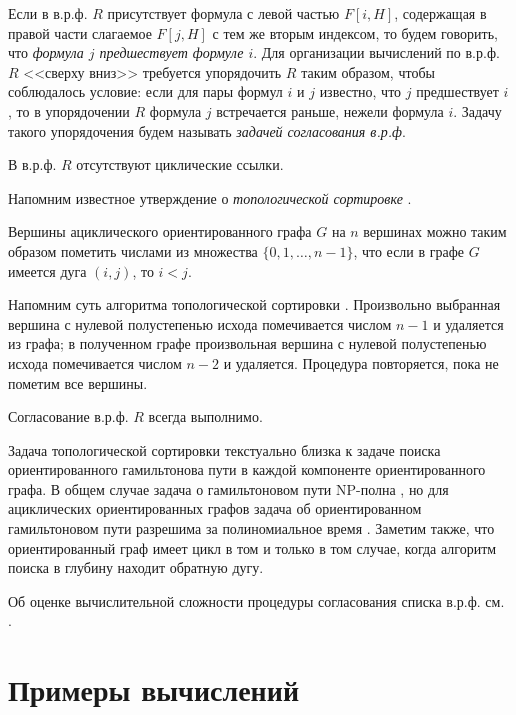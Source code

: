 Если в в.р.ф. $R$ присутствует формула с левой частью $F[i,H]$, содержащая в правой части слагаемое $F[j,H]$ с тем же вторым индексом, то будем говорить, что \textit{ формула $j$ предшествует формуле $i$}. Для организации вычислений по в.р.ф. $R$ <<сверху вниз>> требуется упорядочить $R$ таким образом, чтобы соблюдалось условие: если для пары формул $i$ и $j$ известно, что $j$ предшествует $i$, то в упорядочении $R$ формула $j$ встречается раньше, нежели формула $i$. Задачу такого упорядочения будем называть \textit{ задачей согласования в.р.ф}.

\label{the6}
В в.р.ф. $R$ отсутствуют циклические ссылки.


Напомним известное утверждение о \textit{ топологической сортировке}
\cite{13}.

\label{the7}
Вершины ациклического ориентированного графа $G$ на $n$ вершинах можно таким образом пометить числами из множества $\{0, 1, \dots, n-1\}$, что если в графе $G$ имеется дуга $(i,j)$, то $i<j$.


Напомним суть алгоритма топологической сортировки \cite{13}. Произвольно выбранная вершина с нулевой полустепенью исхода помечивается числом $n-1$ и удаляется из графа; в полученном графе произвольная вершина с нулевой полустепенью исхода помечивается числом $n-2$ и удаляется. Процедура повторяется, пока не пометим все вершины.

\label{the8}
Согласование в.р.ф. $R$ всегда выполнимо.


\begin{remark} Задача топологической сортировки текстуально близка к задаче поиска ориентированного гамильтонова пути в каждой компоненте ориентированного графа. В общем случае задача о гамильтоновом пути NP-полна \cite{14}, но для ациклических ориентированных графов задача об ориентированном гамильтоновом пути разрешима за полиномиальное время
\cite{15}. Заметим также, что ориентированный граф имеет цикл в том и только в том случае, когда алгоритм поиска в глубину \cite{16} находит обратную дугу.

Об оценке вычислительной сложности процедуры согласования списка в.р.ф. см. \cite{17}.
\end{remark}






\section{
Примеры вычислений %
}

